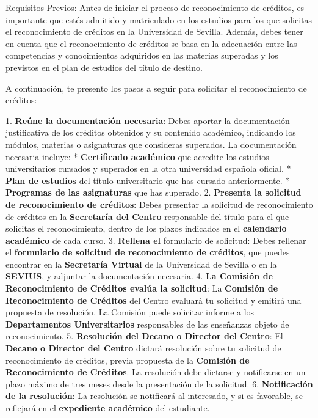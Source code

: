 \documentclass{article}
\begin{document}
\begin{itemize}
\begin{itemize}
                        Requisitos Previos:
                        Antes de iniciar el proceso de reconocimiento de créditos, es importante que estés admitido y matriculado en los estudios para los que solicitas el reconocimiento de créditos en la Universidad de Sevilla. Además, debes tener en cuenta que el reconocimiento de créditos se basa en la adecuación entre las competencias y conocimientos adquiridos en las materias superadas y los previstos en el plan de estudios del título de destino.

                        A continuación, te presento los pasos a seguir para solicitar el reconocimiento de créditos:

                        1. \textbf{Reúne la documentación necesaria}: Debes aportar la documentación justificativa de los créditos obtenidos y su contenido académico, indicando los módulos, materias o asignaturas que consideras superados. La documentación necesaria incluye:
                        * \textbf{Certificado académico} que acredite los estudios universitarios cursados y superados en la otra universidad española oficial.
                        * \textbf{Plan de estudios} del título universitario que has cursado anteriormente.
                        * \textbf{Programas de las asignaturas} que has superado.
                        2. \textbf{Presenta la solicitud de reconocimiento de créditos}: Debes presentar la solicitud de reconocimiento de créditos en la \textbf{Secretaría del Centro} responsable del título para el que solicitas el reconocimiento, dentro de los plazos indicados en el \textbf{calendario académico} de cada curso.
                        3. \textbf{Rellena el }formulario de solicitud\textbf{}: Debes rellenar el \textbf{formulario de solicitud de reconocimiento de créditos}, que puedes encontrar en la \textbf{Secretaría Virtual} de la Universidad de Sevilla o en la \textbf{SEVIUS}, y adjuntar la documentación necesaria.
                        4. \textbf{La Comisión de Reconocimiento de Créditos evalúa la solicitud}: La \textbf{Comisión de Reconocimiento de Créditos} del Centro evaluará tu solicitud y emitirá una propuesta de resolución. La Comisión puede solicitar informe a los \textbf{Departamentos Universitarios} responsables de las enseñanzas objeto de reconocimiento.
                        5. \textbf{Resolución del Decano o Director del Centro}: El \textbf{Decano o Director del Centro} dictará resolución sobre tu solicitud de reconocimiento de créditos, previa propuesta de la \textbf{Comisión de Reconocimiento de Créditos}. La resolución debe dictarse y notificarse en un plazo máximo de tres meses desde la presentación de la solicitud.
                        6. \textbf{Notificación de la resolución}: La resolución se notificará al interesado, y si es favorable, se reflejará en el \textbf{expediente académico} del estudiante.


\end{itemize}
\end{itemize}
\end{document}
